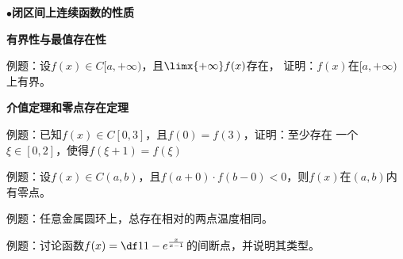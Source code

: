 $\bullet${\bf 闭区间上连续函数的性质}

{\bf 有界性与最值存在性}

例题：设$f(x)\in C[a,+\infty)$，且$\limx{+\infty}f(x)$存在，
证明：$f(x)$在$[a,+\infty)$上有界。

{\bf 介值定理和零点存在定理}

例题：已知$f(x)\in C[0,3]$，且$f(0)=f(3)$，证明：至少存在
一个$\xi\in[0,2]$，使得$f(\xi+1)=f(\xi)$

例题：设$f(x)\in C(a,b)$，且$f(a+0)\cdot f(b-0)<0$，则$f(x)$在$(a,b)$内有零点。

例题：任意金属圆环上，总存在相对的两点温度相同。

例题：讨论函数$f(x)=\df1{1-e^{\frac{x}{x-1}}}$的间断点，并说明其类型。